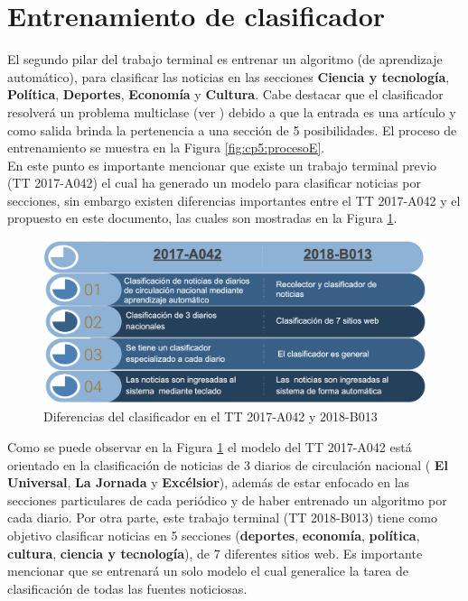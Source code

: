 \section[Entrenar C.]{Entrenamiento de clasificador}

El segundo pilar del trabajo terminal es entrenar un algoritmo (de aprendizaje automático), para clasificar las noticias en las secciones \textbf{Ciencia y tecnología}, \textbf{Política}, \textbf{Deportes}, \textbf{Economía} y \textbf{Cultura}. Cabe destacar que el clasificador resolverá un problema multiclase (ver ) debido a que la entrada es una artículo y como salida brinda la pertenencia a una sección  de 5 posibilidades. El proceso de entrenamiento se muestra en la Figura \ref{fig:cp5:procesoE}.\\



En este punto es importante mencionar que existe un trabajo terminal previo (TT 2017-A042) el cual ha generado un modelo para clasificar noticias por secciones, sin embargo existen diferencias importantes entre el TT 2017-A042 y el propuesto en este documento, las cuales son mostradas en la Figura \ref{cp5:diferenciastt}.



\begin{figure}[h]
\centering
\includegraphics[scale=0.35]{imagenes/capitulo5/entrenamiento/diferenciastt.png}
\caption{Diferencias del clasificador en el TT 2017-A042 y 2018-B013}
\label{cp5:diferenciastt}
\end{figure} 

Como se puede observar en la Figura \ref{cp5:diferenciastt} el modelo del TT 2017-A042 está orientado en la clasificación de noticias de 3 diarios de circulación nacional ( \textbf{El Universal}, \textbf{La Jornada} y \textbf{Excélsior}), además de estar enfocado en las secciones particulares de cada periódico y de haber entrenado un algoritmo por cada diario. Por otra parte, este trabajo terminal (TT 2018-B013) tiene como objetivo clasificar noticias en 5 secciones (\textbf{deportes}, \textbf{economía}, \textbf{política}, \textbf{cultura}, \textbf{ciencia y tecnología}), de 7 diferentes sitios web. Es importante mencionar que se entrenará un solo modelo el cual generalice la tarea de clasificación de todas las fuentes noticiosas.\\  

